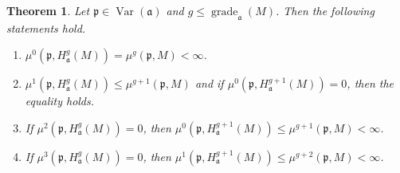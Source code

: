 \documentclass[10pt,a4paper]{amsart}
\newtheorem{thm}{Theorem}
\newcommand{\fa}{\mathfrak{a}}
\def\grade{\operatorname{grade}}
\newcommand{\p}{\mathfrak{p}}
\def\var{\operatorname{Var}}
\begin{document}
\begin{thm}\label{grade}
Let $\p\in \var(\fa)$ and   $g\leq \grade_{\fa}(M)$. Then the following statements hold.
\begin{enumerate}
    \item $\mu^0(\p, H^g_{\fa}(M))= \mu^g(\p, M)< \infty$.
    \item $\mu^1(\p, H^g_{\fa}(M))\leq \mu^{g+ 1}(\p, M)$ and if $\mu^0(\p, H^{g+ 1}_{\fa}(M))= 0$, then the equality holds.
    \item If $\mu^2(\p, H^g_{\fa}(M))= 0$, then $\mu^0(\p, H^{g+ 1}_{\fa}(M)) \leq \mu^{g+ 1}(\p, M)< \infty$.
    \item If $\mu^3(\p, H^g_{\fa}(M))= 0$, then $\mu^1(\p, H^{g+ 1}_{\fa}(M)) \leq \mu^{g+ 2}(\p, M)< \infty$.
\end{enumerate}
    \end{thm}
\end{document}
